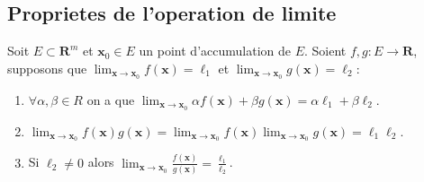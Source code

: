 \subsection*{Proprietes de l'operation de limite}
Soit  $E\subset \mathbf{R}^{m}$ et $\boldsymbol{x}_{0}\in E$ un point d'accumulation de $E$. Soient $f,g:E\to \mathbf{R}$, supposons que $\lim_{ \boldsymbol{x} \to \boldsymbol{x}_{0} }f(\boldsymbol{x})=\ell_{1}$ et $\lim_{ \boldsymbol{x} \to \boldsymbol{x}_{0} }g(\boldsymbol{x})=\ell_{2}$:
\begin{enumerate}
\item $\forall\alpha,\beta \in R$ on a que $\lim_{ \boldsymbol{x} \to \boldsymbol{x}_{0} }\alpha f(\boldsymbol{x})+\beta g(\boldsymbol{x})=\alpha \ell_{1}+\beta \ell_{2}$.
\item $\lim_{ \boldsymbol{x} \to \boldsymbol{x}_{0} }f(\boldsymbol{x})g(\boldsymbol{x})=\lim_{ \boldsymbol{x} \to \boldsymbol{x}_{0} }f(\boldsymbol{x})\lim_{ \boldsymbol{x} \to \boldsymbol{x}_{0} }g(\boldsymbol{x})=\ell_{1}\ell_{2}$.
\item Si $\ell_{2}\neq 0$ alors $\lim_{ \boldsymbol{x} \to \boldsymbol{x}_{0} } \frac{f(\boldsymbol{x})}{g(\boldsymbol{x})}=\frac{\ell_{1}}{\ell_{2}}$.
\end{enumerate}
